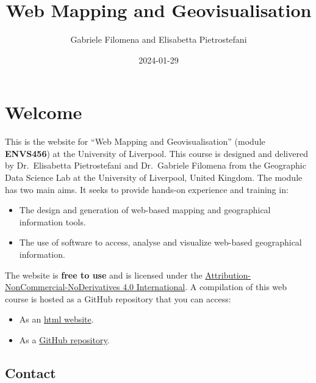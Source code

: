 \documentclass[
  letterpaper,
  DIV=11,
  numbers=noendperiod]{scrreprt}
\title{Web Mapping and Geovisualisation}
\author{Gabriele Filomena and Elisabetta Pietrostefani}
\date{2024-01-29}
\providecommand{\tightlist}{%
  \setlength{\itemsep}{0pt}\setlength{\parskip}{0pt}}\usepackage{longtable,booktabs,array}
\renewcommand*\contentsname{Table of contents}
\newcommand\contentsname{Table of contents}
\begin{document}
\maketitle

\renewcommand*\contentsname{Table of contents}
{
\hypersetup{linkcolor=}
\setcounter{tocdepth}{2}
\tableofcontents
}

\chapter*{Welcome}\label{welcome}


This is the website for ``Web Mapping and Geovisualisation'' (module
\textbf{ENVS456}) at the University of Liverpool. This course is
designed and delivered by Dr.~Elisabetta Pietrostefani and Dr.~Gabriele
Filomena from the Geographic Data Science Lab at the University of
Liverpool, United Kingdom. The module has two main aims. It seeks to
provide hands-on experience and training in:

\begin{itemize}
\tightlist
\item
  The design and generation of web-based mapping and geographical
  information tools.
\item
  The use of software to access, analyse and visualize web-based
  geographical information.
\end{itemize}

The website is \textbf{free to use} and is licensed under the
\href{https://creativecommons.org/licenses/by-nc-nd/4.0/}{Attribution-NonCommercial-NoDerivatives
4.0 International}. A compilation of this web course is hosted as a
GitHub repository that you can access:

\begin{itemize}
\tightlist
\item
  As an \href{https://gdsl-ul.github.io/wma}{html website}.
\item
  As a \href{https://github.com/GDSL-UL/wma}{GitHub repository}.
\end{itemize}

\section*{Contact}\label{contact}

\end{document}
